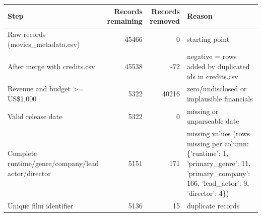 \begin{tabular}{lrrl}
\toprule
Step & Records remaining & Records removed & Reason \\
\midrule
Raw records (movies\_metadata.csv) & 45466 & 0 & starting point \\
After merge with credits.csv & 45538 & -72 & negative = rows added by duplicated ids in credits.csv \\
Revenue and budget >= US\$1,000 & 5322 & 40216 & zero/undisclosed or implausible financials \\
Valid release date & 5322 & 0 & missing or unparseable date \\
Complete runtime/genre/company/lead actor/director & 5151 & 171 & missing values (rows missing per column: \{'runtime': 1, 'primary\_genre': 11, 'primary\_company': 166, 'lead\_actor': 9, 'director': 4\}) \\
Unique film identifier & 5136 & 15 & duplicate records \\
\bottomrule
\end{tabular}
